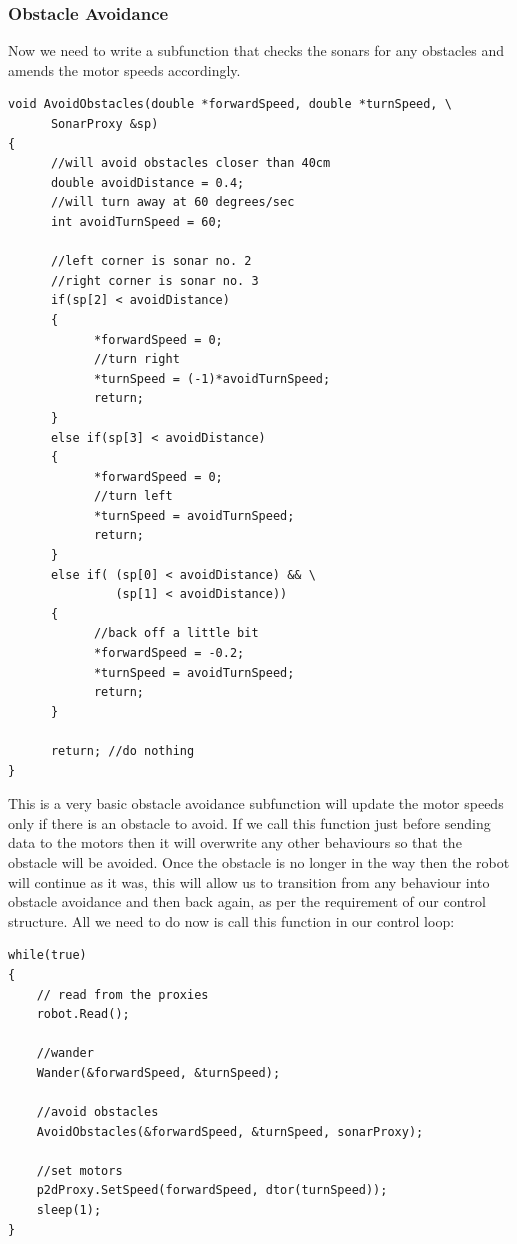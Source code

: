 \documentclass[a4paper]{article}
\begin{document}
\subsubsection{Obstacle Avoidance}
Now we need to write a subfunction that checks the sonars for any obstacles and amends the motor speeds accordingly.
\begin{verbatim}
void AvoidObstacles(double *forwardSpeed, double *turnSpeed, \
      SonarProxy &sp)
{
      //will avoid obstacles closer than 40cm
      double avoidDistance = 0.4;
      //will turn away at 60 degrees/sec
      int avoidTurnSpeed = 60;
      
      //left corner is sonar no. 2
      //right corner is sonar no. 3
      if(sp[2] < avoidDistance)
      {
            *forwardSpeed = 0;
            //turn right
            *turnSpeed = (-1)*avoidTurnSpeed;
            return;
      }
      else if(sp[3] < avoidDistance)
      {
            *forwardSpeed = 0;
            //turn left
            *turnSpeed = avoidTurnSpeed;
            return;
      }
      else if( (sp[0] < avoidDistance) && \
               (sp[1] < avoidDistance))
      {
            //back off a little bit
            *forwardSpeed = -0.2;
            *turnSpeed = avoidTurnSpeed;  
            return;
      }
      
      return; //do nothing
}
\end{verbatim}
This is a very basic obstacle avoidance subfunction will update the motor speeds only if there is an obstacle to avoid. If we call this function just before sending data to the motors then it will overwrite any other behaviours so that the obstacle will be avoided. Once the obstacle is no longer in the way then the robot will continue as it was, this will allow us to transition from any behaviour into obstacle avoidance and then back again, as per the requirement of our control structure. All we need to do now is call this function in our control loop:
\begin{verbatim}
while(true)
{		
    // read from the proxies
    robot.Read();
		
    //wander
    Wander(&forwardSpeed, &turnSpeed);
		
    //avoid obstacles
    AvoidObstacles(&forwardSpeed, &turnSpeed, sonarProxy);
		
    //set motors
    p2dProxy.SetSpeed(forwardSpeed, dtor(turnSpeed));
    sleep(1);
}
\end{verbatim}
\end{document}
